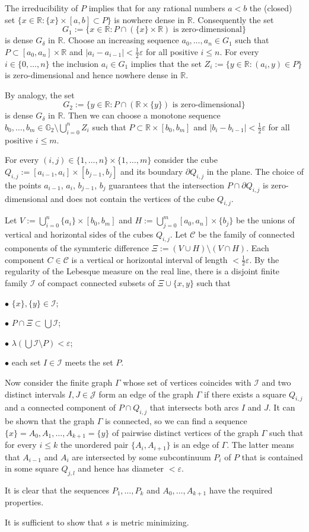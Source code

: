 The irreducibility of $P$ implies that for any rational numbers $a<b$ the (closed) set $\{x\in \mathbb R:\{x\}\times[a,b]\subset P\}$ is nowhere dense in $\mathbb R$. Consequently the set $$G_1:=\{x\in\mathbb R:P\cap(\{x\}\times\mathbb R)\mbox{ is zero-dimensional}\}$$is dense $G_\delta$ in $\mathbb R$. Choose an increasing sequence $a_0,\dots,a_n\in G_1$ such that $P\subset [a_0,a_n]\times\mathbb R$ and $|a_i-a_{i-1}|<\frac12\varepsilon$ for all positive $i\le n$. For every $i\in\{0,\dots,n\}$ the inclusion $a_i\in G_1$ implies that the set $Z_i:=\{y\in \mathbb R:(a_i,y)\in P\}$ is zero-dimensional and hence nowhere dense in $\mathbb R$.

By analogy, the set $$G_2:=\{y\in\mathbb R:P\cap(\mathbb R\times \{y\})\mbox{ is zero-dimensional}\}$$is dense $G_\delta$ in $\mathbb R$. Then we can choose a monotone sequence $b_0,\dots,b_m\in\mathbb G_2\setminus\bigcup_{i=0}^nZ_i$ such that $P\subset \mathbb R\times [b_0,b_m]$ and $|b_i-b_{i-1}|<\frac12\varepsilon$ for all positive $i\le m$.

For every $(i,j)\in\{1,\dots,n\}\times\{1,\dots,m\}$ consider the cube $Q_{i,j}:=[a_{i-1},a_i]\times[b_{j-1},b_j]$ and its boundary $\partial Q_{i,j}$ in the plane.
The choice of the points $a_{i-1}$, $a_i$, $b_{j-1}$, $b_j$ guarantees that the intersection $P\cap\partial Q_{i,j}$ is zero-dimensional and does not contain the vertices of the cube $Q_{i,j}$. 

Let $V:=\bigcup_{i=0}^n\{a_i\}\times [b_0,b_m]$ and $H:=\bigcup_{j=0}^m[a_0,a_n]\times\{b_j\}$ be the unions of vertical and horizontal sides of the cubes $Q_{i,j}$. Let $\mathcal C$ be the family of connected components of the symmteric difference $\Xi:=(V\cup H)\setminus (V\cap H)$. Each component $C\in\mathcal C$ is a vertical or horizontal interval of length $<\frac12\varepsilon$. By the regularity of the Lebesque measure on the real line, there is a disjoint finite family $\mathcal I$ of compact connected subsets of $\Xi\cup\{x,y\}$ such that

$\bullet$ $\{x\},\{y\}\in\mathcal I$;

$\bullet$ $P\cap\Xi\subset \bigcup\mathcal I$;

$\bullet$ $\lambda(\bigcup\mathcal I\setminus P)<\varepsilon$;

$\bullet$ each set $I\in\mathcal I$ meets the set $P$.

Now consider the finite graph $\Gamma$ whose set of vertices coincides with $\mathcal I$ and two distinct intervals $I,J\in\mathcal J$ form an edge of the graph $\Gamma$ if there exists a square $Q_{i,j}$ and a connected component of $P\cap Q_{i,j}$ that intersects both arcs $I$ and $J$. It can be shown that the graph $\Gamma$ is connected, so we can find a sequence $\{x\}=A_0,A_1,\dots,A_{k+1}=\{y\}$ of pairwise distinct vertices of the graph $\Gamma$ such that for every $i\le k$ the unordered pair $\{A_i,A_{i+1}\}$ is an edge of $\Gamma$. The latter means that $A_{i-1}$ and $A_i$ are intersected by some subcontinuum $P_i$ of $P$ that is contained in some square $Q_{j,l}$ and hence has diameter $<\varepsilon$.

It is clear that the sequences $P_1,\dots,P_k$ and $A_0,\dots,A_{k+1}$ have the required properties.
\qeds

It is sufficient to show that $s$ is metric minimizing.
\qeds
